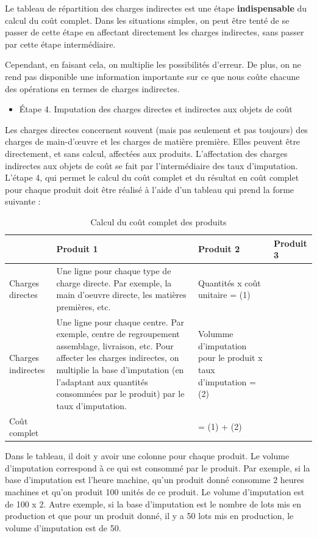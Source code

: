 \documentclass[oneside]{kaobook}
\begin{document}
\begin{kaowarn}
Le tableau de répartition des charges indirectes est une étape \textbf{indispensable} du calcul du coût complet. Dans les situations simples, on peut être tenté de se passer de cette étape en affectant directement les charges indirectes, sans passer par cette étape intermédiaire.

Cependant, en faisant cela, on multiplie les possibilités d'erreur. De plus, on ne rend pas disponible une information importante sur ce que nous coûte chacune des opérations en termes de charges indirectes.
\end{kaowarn}
\begin{itemize}
\item Étape 4. Imputation des charges directes et indirectes aux objets de coût
\end{itemize}
Les charges directes concernent souvent (mais pas seulement et pas toujours) des charges de main-d'œuvre et les charges de matière première. Elles peuvent être directement, et sans calcul, affectées aux produits.
L'affectation des charges indirectes aux objets de coût se fait par l'intermédiaire des taux d'imputation. 
L'étape 4, qui permet le calcul du coût complet et du résultat en coût complet pour chaque produit doit être réalisé à l'aide d'un tableau qui prend la forme suivante :
\begin{table}[htbp]
\caption{Calcul du coût complet des produits}
\centering
\footnotesize
\begin{tabular}{p{1cm} p{5cm} p{2cm} p{2cm}}
 & Produit 1 & Produit 2 & Produit 3\\
\hline
Charges directes & Une ligne pour chaque type de charge directe. Par exemple, la main d'oeuvre directe, les matières premières, etc. & Quantités x coût unitaire = (1) & \\
Charges indirectes & Une ligne pour chaque centre. Par exemple, centre de regroupement assemblage, livraison, etc. Pour affecter les charges indirectes, on multiplie la base d'imputation (en l'adaptant aux quantités consommées par le produit) par le taux d'imputation. & Volumme d'imputation pour le produit x taux d'imputation = (2) & \\
Coût complet &  & = (1) + (2) & \\
\end{tabular}
\end{table}

Dans le tableau, il doit y avoir une colonne pour chaque produit. Le volume d'imputation correspond à ce qui est consommé par le produit. Par exemple, si la base d'imputation est l'heure machine, qu'un produit donné consomme 2 heures machines et qu'on produit 100 unités de ce produit. Le volume d'imputation est de 100 x 2. Autre exemple, si la base d'imputation est le nombre de lots mis en production et que pour un produit donné, il y a 50 lots mis en production, le volume d'imputation est de 50.
\end{document}
